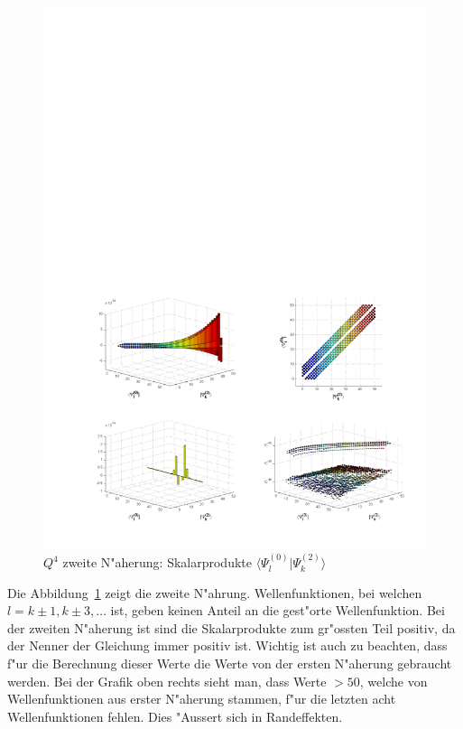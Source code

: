 \begin{refsection}
\begin{figure}	%
\centering
\includegraphics[width=1.0\textwidth]{anharmonisch/images/x4/Stoerung2Skalare.pdf}
\caption{$Q^4$ zweite N"aherung: Skalarprodukte $\langle\Psi_l^{(0)}|\Psi_k^{(2)}\rangle$
\label{skript:x4_Stoerung2Skalare}}
\end{figure}

Die Abbildung~\ref{skript:x4_Stoerung2Skalare} zeigt die zweite N"ahrung.
Wellenfunktionen, bei welchen $l=k\pm 1,k\pm 3,\dots$ ist,
geben keinen Anteil an die gest"orte Wellenfunktion.
Bei der zweiten N"aherung ist sind die Skalarprodukte zum gr"ossten Teil positiv,
da der Nenner der Gleichung immer positiv ist.
Wichtig ist auch zu beachten, dass f"ur die Berechnung dieser Werte die Werte von
der ersten N"aherung gebraucht werden.
Bei der Grafik oben rechts sieht man, dass Werte $>50$, welche von Wellenfunktionen
aus erster N"aherung stammen, f"ur die letzten acht Wellenfunktionen fehlen.
Dies "Aussert sich in Randeffekten. 



\end{refsection}
